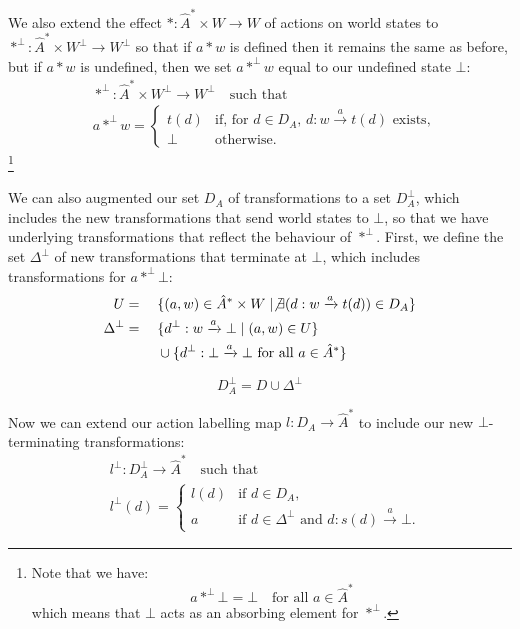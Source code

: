 We also extend the effect $\ast : \hat{A}^{\ast} \times W \to W$ of actions on world states to $\ast^{\bot} : \hat{A}^{\ast} \times W^{\bot} \to  W^{\bot}$ so that if $a \ast w$ is defined then it remains the same as before, but if $a \ast w$ is undefined, then we set $a \ast^{\bot} w$ equal to our undefined state $\bot$:
\begin{align}
    &\ast^{\bot} : \hat{A}^{\ast} \times W^{\bot} \to  W^{\bot} \quad\text{such that} \\
    &a \ast^{\bot} w =
    \begin{cases} 
        t(d) & \text{if, for $d \in D_{A}$, } d : w \xrightarrow{a} t(d) \text{ exists}, \\
        \bot & \text{otherwise.}
    \end{cases}
\end{align}
\footnote{
Note that we have:
\begin{equation}
    a \ast^{\bot} \bot = \bot \quad \text{for all $a \in \hat{A}^{\ast}$}
\end{equation}
which means that $\bot$ acts as an absorbing element for $\ast^{\bot}$.
}

We can also augmented our set $D_{A}$ of transformations to a set $D_{A}^{\bot}$, which includes the new transformations that send world states to $\bot$, so that we have underlying transformations that reflect the behaviour of $\ast^{\bot}$.
First, we define the set $\Delta^{\bot}$ of new transformations that terminate at $\bot$, which includes transformations for $a \ast^{\bot} \bot$:
\begin{alignat}{2}
    U &{}={} & & \{ (a,w) \in \hat{A}^{\ast} \times W \mid \not\exists (d: w \xrightarrow{a} t(d)) \in D_{A} \} \\
    \Delta^{\bot} &{}={} & & \{ d^{\bot}: w \xrightarrow{a} \bot \mid (a, w) \in U \} \\
                  &      & & \cup \{ d^{\bot}: \bot \xrightarrow{a} \bot \text{ for all $a \in \hat{A}^{\ast}$} \}
\end{alignat}

\begin{equation}
    D_{A}^{\bot} = D \cup \Delta^{\bot}
\end{equation}

Now we can extend our action labelling map $l: D_{A} \to \hat{A}^{\ast}$ to include our new $\bot$-terminating transformations:
\begin{align}
    &l^{\bot} : D_{A}^{\bot} \to \hat{A}^{\ast} \quad\text{such that} \\
    &l^{\bot}(d) =
    \begin{cases} 
        l(d) & \text{if $d \in D_{A}$}, \\
        a & \text{if $d \in \Delta^{\bot}$ and $d: s(d) \xrightarrow{a} \bot$.}
    \end{cases}
\end{align}

